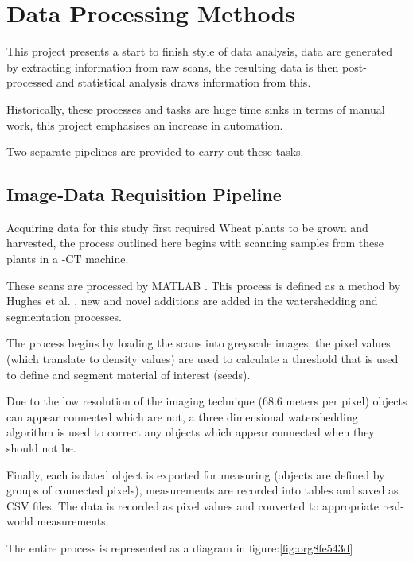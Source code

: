 \documentclass[11pt]{report}
\begin{document}
\section{Data Processing Methods}
\label{sec:orgbf1b8a7}
This project presents a start to finish style of data analysis, data are generated by extracting information from raw scans, the resulting data is then post-processed and statistical analysis draws information from this.

Historically, these processes and tasks are huge time sinks in terms of manual work, this project emphasises an increase in automation.

Two separate pipelines are provided to carry out these tasks.

\subsection{Image-Data Requisition Pipeline}
\label{sec:org26e9430}

Acquiring data for this study first required Wheat plants to be grown and harvested, the process outlined here begins with scanning samples from these plants in a \textmu{}-CT machine.

These scans are processed by MATLAB \cite{MATHWORKS2017}. This process is defined as a method by Hughes et al. \cite{Hughes2017}, new and novel additions are added in the watershedding and segmentation processes.

The process begins by loading the scans into greyscale images, the pixel values (which translate to density values) are used to calculate a threshold that is used to define and segment material of interest (seeds).

Due to the low resolution of the imaging technique (68.6\textmu{} meters per pixel) objects can appear connected which are not, a three dimensional watershedding algorithm is used to correct any objects which appear connected when they should not be.

Finally, each isolated object is exported for measuring (objects are defined by groups of connected pixels), measurements are recorded into tables and saved as CSV files. The data is recorded as pixel values and converted to appropriate real-world measurements.

The entire process is represented as a diagram in figure:\ref{fig:org8fe543d}
\end{document}
